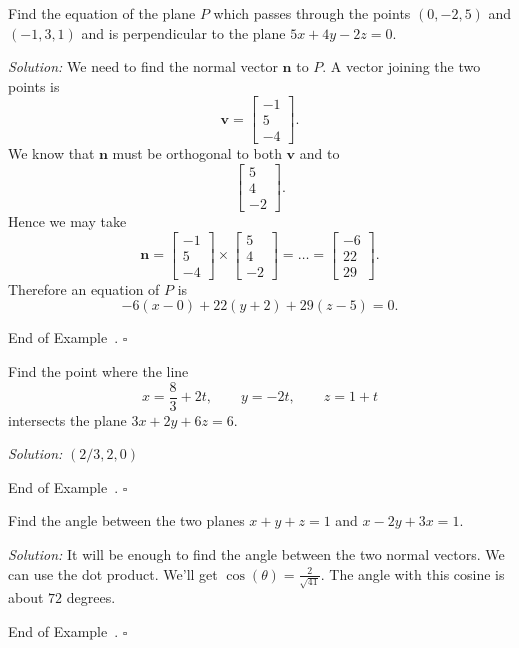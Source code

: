 \documentclass[10pt]{article}
\theoremstyle{definition}
\newtheorem{example}[theorem]{Example}
\renewenvironment{example}
{\begin{oldexample}}
  {\par\smallskip\hfill   End of Example~\theexample. $\square$    \par\end{oldexample}}
\newcommand{\1}[1]{\textbf{1}_{\left[#1\right]}} %
\begin{document}
\begin{example}
  Find the equation of the plane $P$ which passes through the points $(0,-2,5)$
  and $(-1,3,1)$ and is perpendicular to the plane $5x+4y-2z=0$.

  \textit{Solution:} We need to find the normal vector $\boldsymbol{n}$ to $P$.
  A vector joining the two points is
  \begin{equation*}
    \boldsymbol{v} =
    \begin{bmatrix}
      -1\\5\\-4
    \end{bmatrix}.
  \end{equation*}
  We know that $\boldsymbol{n}$ must be orthogonal to both $\boldsymbol{v}$
  and to
  \begin{equation*}
    \begin{bmatrix}
      5\\4\\-2
    \end{bmatrix}.
  \end{equation*}
  Hence we may take
  \begin{equation*}
    \boldsymbol{n} =
    \begin{bmatrix}
      -1\\5\\-4
    \end{bmatrix}
    \times
    \begin{bmatrix}
      5\\4\\-2
    \end{bmatrix}
    = \ldots
    =
    \begin{bmatrix}
      -6\\22\\29
    \end{bmatrix}.
  \end{equation*}
  Therefore an equation of $P$ is
  \begin{equation*}
    -6(x-0)+ 22(y+2)+29(z-5)=0.
  \end{equation*}
\end{example}


\begin{example}
  Find the point where the line
  \begin{equation*}
    x = \frac{8}{3}+2t, \qquad y = -2t, \qquad z = 1+t
  \end{equation*}
  intersects the plane $3x+2y+6z=6$.

  \textit{Solution:} $(2/3,2,0) $
\end{example}
\begin{example}
  Find the angle between the two planes $x+y+z=1$ and $x-2y+3x=1$.

  \textit{Solution:} It will be enough to find the angle between the two normal
  vectors. We can use the dot product. We'll get
  $\cos(\theta) = \frac{2}{\sqrt{41}}$. The angle with this cosine is about $72$
  degrees.
\end{example}
\end{document}
